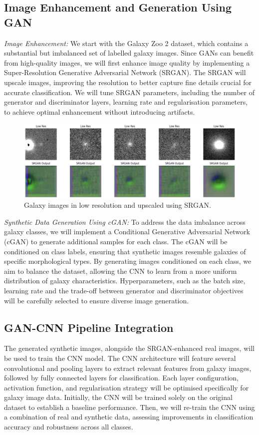 \documentclass[10pt,twocolumn,letterpaper]{article}
\begin{document}
\subsection{Image Enhancement and Generation Using GAN}
\noindent \textit{Image Enhancement:} We start with the Galaxy Zoo 2 dataset, which contains a substantial but imbalanced set of labelled galaxy images. 
Since GANs can benefit from high-quality images, we will first enhance image quality by implementing a Super-Resolution Generative Adversarial Network (SRGAN). 
The SRGAN will upscale images, improving the resolution to better capture fine details crucial for accurate classification. 
We will tune SRGAN parameters, including the number of generator and discriminator layers, learning rate and regularisation parameters, to achieve optimal enhancement without introducing artifacts.
\begin{figure}[htbp]
    \includegraphics[width=\linewidth]{srgan.png}
    \caption{Galaxy images in low resolution and upscaled using SRGAN.}
    \label{fig:galaxysrgan}
  \end{figure}

\noindent \textit{Synthetic Data Generation Using cGAN:} To address the data imbalance across galaxy classes, we will implement a Conditional Generative Adversarial Network (cGAN) to generate additional samples for each class. 
The cGAN will be conditioned on class labels, ensuring that synthetic images resemble galaxies of specific morphological types. 
By generating images conditioned on each class, we aim to balance the dataset, allowing the CNN to learn from a more uniform distribution of galaxy characteristics. 
Hyperparameters, such as the batch size, learning rate and the trade-off between generator and discriminator objectives will be carefully selected to ensure diverse image generation.

\subsection{GAN-CNN Pipeline Integration} The generated synthetic images, alongside the SRGAN-enhanced real images, will be used to train the CNN model. 
The CNN architecture will feature several convolutional and pooling layers to extract relevant features from galaxy images, followed by fully connected layers for classification. 
Each layer configuration, activation function, and regularisation strategy will be optimised specifically for galaxy image data. 
Initially, the CNN will be trained solely on the original dataset to establish a baseline performance. 
Then, we will re-train the CNN using a combination of real and synthetic data, assessing improvements in classification accuracy and robustness across all classes.
\end{document}
